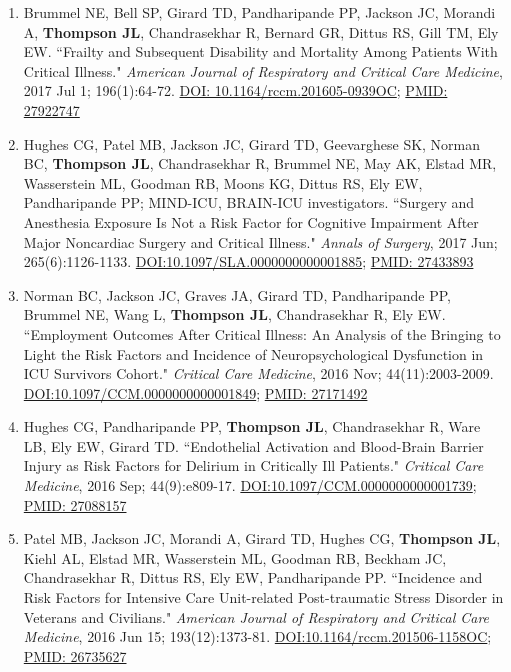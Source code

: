 \documentclass[5pt]{article}
\begin{document}
\begin{enumerate}
\item Brummel NE, Bell SP, Girard TD, Pandharipande PP, Jackson JC, Morandi A, \textbf{Thompson JL}, Chandrasekhar R, Bernard GR, Dittus RS, Gill TM, Ely EW. ``Frailty and Subsequent Disability and Mortality Among Patients With Critical Illness." \emph{American Journal of Respiratory and Critical Care Medicine}, 2017 Jul 1; 196(1):64-72. \href{https://doi.org/10.1164/rccm.201605-0939OC}{DOI: 10.1164/rccm.201605-0939OC}; \href{https://www.ncbi.nlm.nih.gov/pubmed/27922747}{PMID: 27922747}
\item Hughes CG, Patel MB, Jackson JC, Girard TD, Geevarghese SK, Norman BC, \textbf{Thompson JL}, Chandrasekhar R, Brummel NE, May AK, Elstad MR, Wasserstein ML, Goodman RB, Moons KG, Dittus RS, Ely EW, Pandharipande PP; MIND-ICU, BRAIN-ICU investigators. ``Surgery and Anesthesia Exposure Is Not a Risk Factor for Cognitive Impairment After Major Noncardiac Surgery and Critical Illness." \emph{Annals of Surgery}, 2017 Jun; 265(6):1126-1133. \href{https://doi.org/10.1097/SLA.0000000000001885}{DOI:10.1097/SLA.0000000000001885}; \href{https://www.ncbi.nlm.nih.gov/pubmed/27433893/}{PMID: 27433893}
\item Norman BC, Jackson JC, Graves JA, Girard TD, Pandharipande PP, Brummel NE, Wang L, \textbf{Thompson JL}, Chandrasekhar R, Ely EW. ``Employment Outcomes After Critical Illness: An Analysis of the Bringing to Light the Risk Factors and Incidence of Neuropsychological Dysfunction in ICU Survivors Cohort." \emph{Critical Care Medicine}, 2016 Nov; 44(11):2003-2009. \href{https://doi.org/10.1097/CCM.0000000000001849}{DOI:10.1097/CCM.0000000000001849}; \href{https://www.ncbi.nlm.nih.gov/pubmed/27171492}{PMID: 27171492}
\item Hughes CG, Pandharipande PP, \textbf{Thompson JL}, Chandrasekhar R, Ware LB, Ely EW, Girard TD. ``Endothelial Activation and Blood-Brain Barrier Injury as Risk Factors for Delirium in Critically Ill Patients." \emph{Critical Care Medicine}, 2016 Sep; 44(9):e809-17. \href{https://doi.org/10.1097/CCM.0000000000001739}{DOI:10.1097/CCM.0000000000001739}; \href{https://www.ncbi.nlm.nih.gov/pubmed/27088157}{PMID: 27088157}
\item Patel MB, Jackson JC, Morandi A, Girard TD, Hughes CG, \textbf{Thompson JL}, Kiehl AL, Elstad MR, Wasserstein ML, Goodman RB, Beckham JC, Chandrasekhar R, Dittus RS, Ely EW, Pandharipande PP. ``Incidence and Risk Factors for Intensive Care Unit-related Post-traumatic Stress Disorder in Veterans and Civilians." \emph{American Journal of Respiratory and Critical Care Medicine}, 2016 Jun 15; 193(12):1373-81. \href{https://doi.org/10.1164/rccm.201506-1158OC}{DOI:10.1164/rccm.201506-1158OC}; \href{https://www.ncbi.nlm.nih.gov/pubmed/26735627}{PMID: 26735627}

\end{enumerate}
\end{document}
